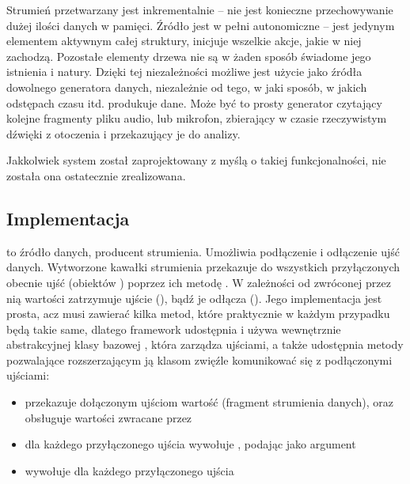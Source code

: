Strumień przetwarzany jest inkrementalnie -- nie jest konieczne przechowywanie dużej ilości danych w
pamięci. Źródło jest w pełni autonomiczne -- jest jedynym elementem aktywnym całej struktury,
inicjuje wszelkie akcje, jakie w niej zachodzą. Pozostałe elementy drzewa nie są w żaden sposób
świadome jego istnienia i natury. Dzięki tej niezależności możliwe jest użycie jako źródła dowolnego
generatora danych, niezależnie od tego, w jaki sposób, w jakich odstępach czasu itd. produkuje dane.
Może być to prosty generator czytający kolejne fragmenty pliku audio, lub mikrofon, zbierający w
czasie rzeczywistym dźwięki z otoczenia i przekazujący je do analizy.

\begin{Note}
  Jakkolwiek system został zaprojektowany z myślą o takiej funkcjonalności, nie została ona
  ostatecznie zrealizowana.
\end{Note}


\subsection{Implementacja}


 to źródło danych, producent strumienia. Umożliwia podłączenie i odłączenie ujść
danych. Wytworzone kawałki strumienia przekazuje do wszystkich przyłączonych obecnie ujść (obiektów
) poprzez ich metodę . W zależności od zwróconej przez nią wartości
zatrzymuje ujście (), bądź je odłącza (). Jego implementacja jest
prosta, acz musi zawierać kilka metod, które praktycznie w każdym przypadku będą takie same, dlatego
framework udostępnia i używa wewnętrznie abstrakcyjnej klasy bazowej ,
która zarządza ujściami, a także udostępnia metody pozwalające rozszerzającym ją klasom zwięźle
komunikować się z podłączonymi ujściami:

\begin{itemize}

  \item {} przekazuje dołączonym ujściom wartość  (fragment
    strumienia danych), oraz obsługuje wartości zwracane przez 

  \item {} dla każdego przyłączonego ujścia wywołuje ,
    podając  jako argument

  \item {} wywołuje  dla każdego przyłączonego ujścia

\end{itemize}

